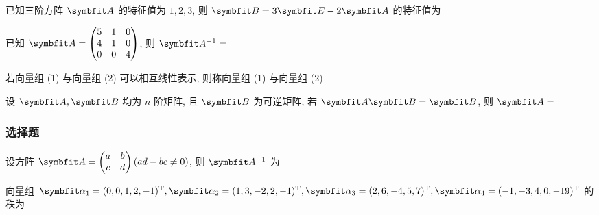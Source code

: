 \begin{ti}
	已知三阶方阵 $\bA$ 的特征值为 $1,2,3$, 则 $\bB = 3 \bE - 2 \bA$ 的特征值为 \hua
\end{ti}

\begin{ti}
	已知 $\bA = \begin{pmatrix}
		5 & 1 & 0 \\
		4 & 1 & 0 \\
		0 & 0 & 4
	\end{pmatrix}$, 则 $\bA^{-1} = $ \hua
\end{ti}

\begin{ti}
	若向量组 (1) 与向量组 (2) 可以相互线性表示, 则称向量组 (1) 与向量组 (2) \hua
\end{ti}

\begin{ti}
	设 $\bA,\bB$ 均为 $n$ 阶矩阵, 且 $\bB$ 为可逆矩阵, 若 $\bA \bB = \bB$, 则 $\bA = $ \hua
\end{ti}

\subsubsection{选择题}
\begin{ti}
	设方阵 $\bA = \begin{pmatrix}
		a & b \\
		c & d
	\end{pmatrix} (ad - bc \ne 0)$, 则 $\bA^{-1}$ 为 \kuo
\end{ti}

\begin{ti}
	向量组 $\balpha_{1} = (0,0,1,2,-1)^{\TT}, \balpha_{2} = (1,3,-2,2,-1)^{\TT}, \balpha_{3} = (2,6,-4,5,7)^{\TT}, \balpha_{4} = (-1,-3,4,0,-19)^{\TT}$ 的秩为 \kuo
\end{ti}

